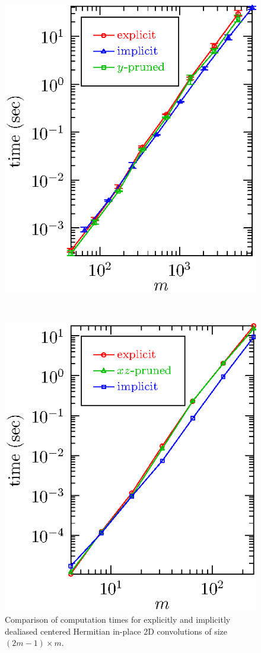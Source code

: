 \documentclass[final]{siamltex}
\begin{document}
\begin{figure}[htbp]
\begin{minipage}{0.49\linewidth}
\begin{center}
\includegraphics{timing2r}
\caption{Comparison of computation times for explicitly and implicitly
dealiased centered Hermitian in-place 2D convolutions of size \hbox{$(2m-1)\times m$}.}
\label{timing2r}
\end{center}
\end{minipage}
\,
\begin{minipage}{0.49\linewidth}
\begin{center}
\includegraphics{timing3c}

\end{center}
\end{minipage}
\end{figure}
\end{document}

